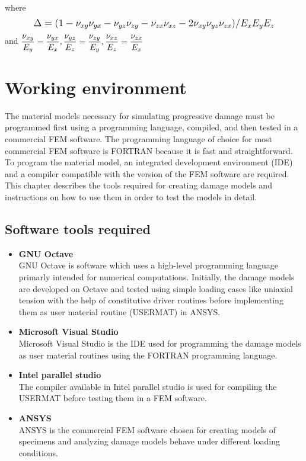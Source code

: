 \documentclass[12pt,openright,twoside]{report}
\begin{document}
 where 
 \begin{align*}
\mathlarger{ \Delta = (1 - \nu_{xy}\nu_{yx} - \nu_{yz}\nu_{zy} - \nu_{zx}\nu_{xz} - 2\nu_{xy}\nu_{yz}\nu_{zx})/E_{x}E_{y}E_{z}}
 \end{align*}
   and  $\mathlarger{\frac{\nu_{xy}}{E_{y}} = \frac{\nu_{yx}}{E_{x}}, \frac{\nu_{yz}}{E_{z}} = \frac{\nu_{zy}}{E_{y}}, \frac{\nu_{xz}}{E_{z}} = \frac{\nu_{zx}}{E_{x}} }$ 


\newpage
\vspace*{3cm}
\chapter{Working environment}
\vspace*{1cm}
\indent\indent\indent  The material models necessary for simulating progressive damage must be programmed first using a programming language, compiled, and then tested in a commercial FEM software. The programming language of choice for most commercial FEM software is FORTRAN because it is fast and straightforward. To program the material model, an integrated development environment (IDE) and a compiler compatible with the version of the FEM software are required. This chapter describes the tools required for creating damage models and instructions on how to use them in order to test the models in detail.   
\vspace*{1cm}
\section{Software tools required}
\begin{itemize}
\item \textbf{GNU Octave}\\ \indent
\hspace*{13mm} GNU Octave is software which uses a high-level programming language primarly intended for numerical computations. Initially, the damage models are developed on Octave and tested using simple loading cases like uniaxial tension with the help of constitutive driver routines before implementing them as user material routine (USERMAT) in ANSYS. 
\item \textbf{Microsoft Visual Studio }\\
\hspace*{13mm} Microsoft Visual Studio is the IDE used for programming the damage models as user material routines using the FORTRAN programming language.
\item \textbf{Intel parallel studio}\\
\hspace*{13mm} The compiler available in Intel parallel studio is used for compiling the USERMAT before testing them in a FEM software.
\item \textbf{ANSYS }\\
\hspace*{13mm}ANSYS is the commercial FEM software chosen for creating models of specimens and analyzing damage models behave under different loading conditions.
\end{itemize}
\end{document}
